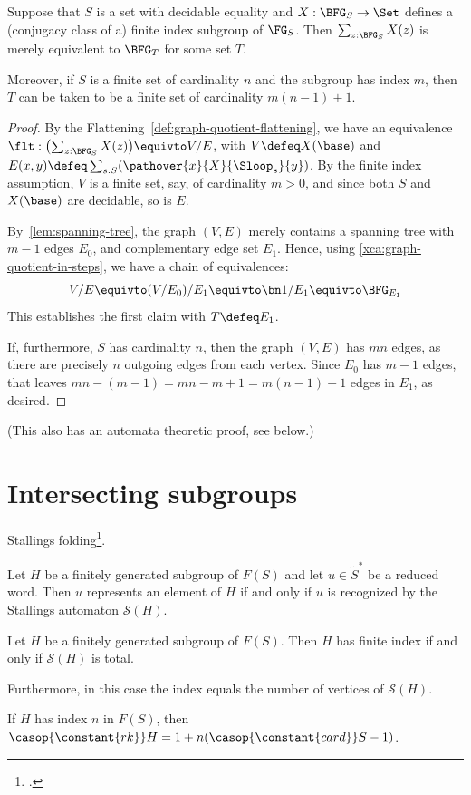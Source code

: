 \begin{theorem}\label{thm:nielsen-schreier}
  Suppose that $S$ is a set with decidable equality and
  $X : \BFG_S \to \Set$ defines a (conjugacy class of a)
  finite index subgroup of $\FG_S$.
  Then $\sum_{z:\BFG_S}X(z)$ is merely equivalent to $\BFG_T$ for some set $T$.

  Moreover, if $S$ is a finite set of cardinality $n$ and the subgroup has index $m$,
  then $T$ can be taken to be a finite set of cardinality $m(n-1)+1$.
\end{theorem}
\begin{proof}
  By the Flattening~\cref{def:graph-quotient-flattening},
  we have an equivalence $\flt:\bigl(\sum_{z:\BFG_S}X(z)\bigr) \equivto V/E$,
  with $V\defeq X(\base)$ and $E(x,y) \defeq \sum_{s:S}(\pathover{x}{X}{\Sloop_s}{y})$.
  By the finite index assumption, $V$ is a finite set,
  say, of cardinality $m>0$,
  and since both $S$ and $X(\base)$ are decidable, so is $E$.

  By~\cref{lem:spanning-tree}, the graph $(V,E)$ merely contains
  a spanning tree with
  $m-1$ edges $E_0$, and complementary edge set $E_1$. Hence,
  using \cref{xca:graph-quotient-in-steps}, we have a chain of equivalences:
  \[
    V/E \equivto (V/E_0)/E_1
    \equivto \bn 1/E_1 \equivto \BFG_{E_1}
  \]
  This establishes the first claim with $T \defeq E_1$.

  If, furthermore, $S$ has cardinality $n$, then the graph $(V,E)$
  has $mn$ edges, as there are precisely $n$ outgoing edges from each vertex.
  Since $E_0$ has $m-1$ edges,
  that leaves $mn - (m-1) = mn-m+1 = m(n-1)+1$ edges in $E_1$, as desired.
\end{proof}
(This also has an automata theoretic proof, see below.)

\section{Intersecting subgroups}
\label{sec:intersecting-subgroups}

Stallings folding\footcite{Stallings1991}.

\begin{theorem}
  Let $H$ be a finitely generated subgroup of $F(S)$ and let $u\in\tilde S^*$
  be a reduced word. Then $u$ represents an element of $H$ if and only if
  $u$ is recognized by the Stallings automaton $\mathcal{S}(H)$.
\end{theorem}
\begin{theorem}
  Let $H$ be a finitely generated subgroup of $F(S)$.
  Then $H$ has finite index if and only if $\mathcal{S}(H)$ is total.

  Furthermore, in this case the index equals the number of vertices of
  $\mathcal{S}(H)$.
\end{theorem}
\begin{corollary}
  If $H$ has index $n$ in $F(S)$, then $\casop{\constant{rk}} H = 1 + n(\casop{\constant{card}} S-1)$.
\end{corollary}

